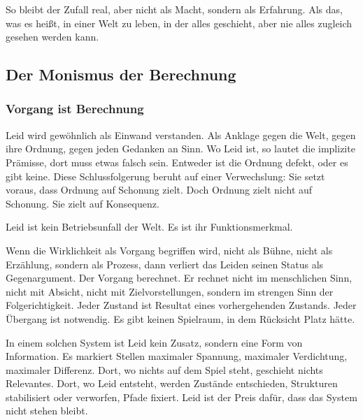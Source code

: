 \documentclass[
  ngerman,
]{article}
\begin{document}
So bleibt der Zufall real, aber nicht als Macht, sondern als
Erfahrung. Als das, was es heißt, in einer Welt zu leben, in der alles
geschieht, aber nie alles zugleich gesehen werden kann.

\subsection{\texorpdfstring{\hfill\break
}{ }}\label{section-1}

\subsection{\texorpdfstring{\textbf{Der Monismus der
Berechnung}}{Der Monismus der Berechnung}}\label{der-monismus-der-berechnung}

\subsubsection{\texorpdfstring{\textbf{Vorgang ist
Berechnung}}{Vorgang ist Berechnung}}\label{vorgang-ist-berechnung}

Leid wird gewöhnlich als Einwand verstanden. Als Anklage gegen die Welt,
gegen ihre Ordnung, gegen jeden Gedanken an Sinn. Wo Leid ist, so lautet
die implizite Prämisse, dort muss etwas falsch sein. Entweder ist die
Ordnung defekt, oder es gibt keine. Diese Schlussfolgerung beruht auf
einer Verwechslung: Sie setzt voraus, dass Ordnung auf Schonung zielt.
Doch Ordnung zielt nicht auf Schonung. Sie zielt auf Konsequenz.

Leid ist kein Betriebsunfall der Welt. Es ist ihr Funktionsmerkmal.

Wenn die Wirklichkeit als Vorgang begriffen wird, nicht als Bühne, nicht
als Erzählung, sondern als Prozess, dann verliert das Leiden seinen
Status als Gegenargument. Der Vorgang berechnet. Er rechnet nicht im
menschlichen Sinn, nicht mit Absicht, nicht mit Zielvorstellungen,
sondern im strengen Sinn der Folgerichtigkeit. Jeder Zustand ist
Resultat eines vorhergehenden Zustands. Jeder Übergang ist notwendig. Es
gibt keinen Spielraum, in dem Rücksicht Platz hätte.

In einem solchen System ist Leid kein Zusatz, sondern eine Form von
Information. Es markiert Stellen maximaler Spannung, maximaler
Verdichtung, maximaler Differenz. Dort, wo nichts auf dem Spiel steht,
geschieht nichts Relevantes. Dort, wo Leid entsteht, werden Zustände
entschieden, Strukturen stabilisiert oder verworfen, Pfade fixiert. Leid
ist der Preis dafür, dass das System nicht stehen bleibt.
\end{document}
